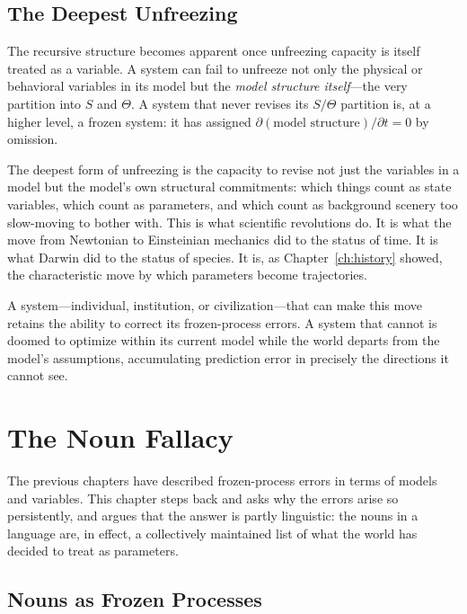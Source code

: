 \documentclass[11pt]{book}
\theoremstyle{plain}
\theoremstyle{definition}
\theoremstyle{remark}
\begin{document}
\section{The Deepest Unfreezing}

The recursive structure becomes apparent once unfreezing capacity is itself treated as a variable. A system can fail to unfreeze not only the physical or behavioral variables in its model but the \emph{model structure itself}---the very partition into $S$ and $\Theta$. A system that never revises its $S/\Theta$ partition is, at a higher level, a frozen system: it has assigned $\partial(\text{model structure})/\partial t = 0$ by omission.

The deepest form of unfreezing is the capacity to revise not just the variables in a model but the model's own structural commitments: which things count as state variables, which count as parameters, and which count as background scenery too slow-moving to bother with. This is what scientific revolutions do. It is what the move from Newtonian to Einsteinian mechanics did to the status of time. It is what Darwin did to the status of species. It is, as Chapter~\ref{ch:history} showed, the characteristic move by which parameters become trajectories.

A system---individual, institution, or civilization---that can make this move retains the ability to correct its frozen-process errors. A system that cannot is doomed to optimize within its current model while the world departs from the model's assumptions, accumulating prediction error in precisely the directions it cannot see.

\chapter{The Noun Fallacy}
\label{ch:nouns}

The previous chapters have described frozen-process errors in terms of models and variables. This chapter steps back and asks why the errors arise so persistently, and argues that the answer is partly linguistic: the nouns in a language are, in effect, a collectively maintained list of what the world has decided to treat as parameters.

\section{Nouns as Frozen Processes}
\end{document}
